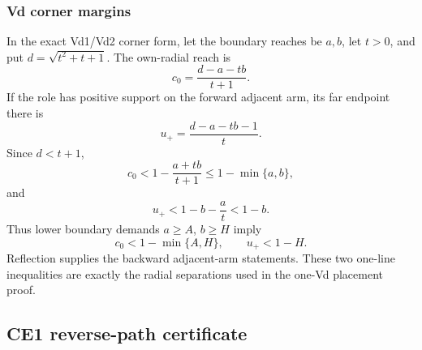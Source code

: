 \subsubsection{Vd corner margins}

In the exact Vd1/Vd2 corner form, let the boundary reaches be $a,b$, let
$t>0$, and put $d=\sqrt{t^2+t+1}$.  The own-radial reach is
\[
 c_0=\frac{d-a-tb}{t+1}.
\]
If the role has positive support on the forward adjacent arm, its far endpoint
there is
\[
 u_+=\frac{d-a-tb-1}{t}.
\]
Since $d<t+1$,
\[
 c_0<1-\frac{a+tb}{t+1}
 \le1-\min\{a,b\},
 \tag{6.70}
\]
and
\[
 u_+<1-b-\frac at<1-b.
 \tag{6.71}
\]
Thus lower boundary demands $a\ge A$, $b\ge H$ imply
\[
 c_0<1-\min\{A,H\},
 \qquad
 u_+<1-H.
\]
Reflection supplies the backward adjacent-arm statements.  These two
one-line inequalities are exactly the radial separations used in the one-Vd
placement proof.


\subsection{CE1 reverse-path certificate}
\label{subsec:calc-ce1-reverse-path}


